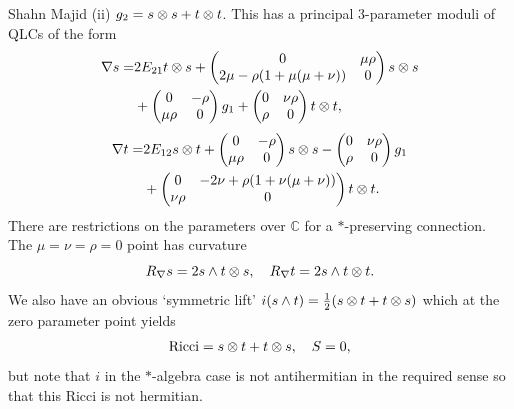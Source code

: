 \begin{artengenv}{Shahn Majid}
(ii) $g_2=s\otimes s+ t\otimes t$. This has a principal 3-parameter moduli of QLCs of the form
\begin{align*}
\nabla s=&2E_{21}t\otimes s + \begin{pmatrix}0&\mu\rho\\ 2\mu-\rho(1+\mu(\mu+\nu)) & 0\end{pmatrix}s\otimes s\\
& +\begin{pmatrix}0&-\rho \\ \mu\rho & 0\end{pmatrix}g_1 +\begin{pmatrix}0&\nu\rho\\ \rho & 0\end{pmatrix}t\otimes t,
\end{align*}
\begin{align*}
\nabla t=&2E_{12}s\otimes t +\begin{pmatrix}0&- \rho\\ \mu\rho & 0\end{pmatrix} s\otimes s -\begin{pmatrix}0&\nu \rho \\ \rho & 0\end{pmatrix}g_1\\
& +\begin{pmatrix}0& -2\nu+\rho(1+\nu(\mu+\nu))\\ \nu\rho & 0\end{pmatrix}t\otimes t.
\end{align*}
There are restrictions on the parameters over $\mathbb{C}$ for a $*$-preserving connection. The $\mu=\nu=\rho=0$ point has curvature
\[ R_\nabla s=2 s\wedge t\otimes s,\quad R_\nabla t=2 s\wedge t\otimes t.\]
We also have an obvious `symmetric lift' $i(s\wedge t)={1\over 2}( s\otimes t+ t\otimes s)$ which at the zero parameter point yields 
\[ {\rm Ricci}=s\otimes t+t\otimes s,\quad S=0,\]
but note that $i$ in the $*$-algebra case is not antihermitian in the required sense so that this Ricci is not hermitian.


\end{artengenv}
